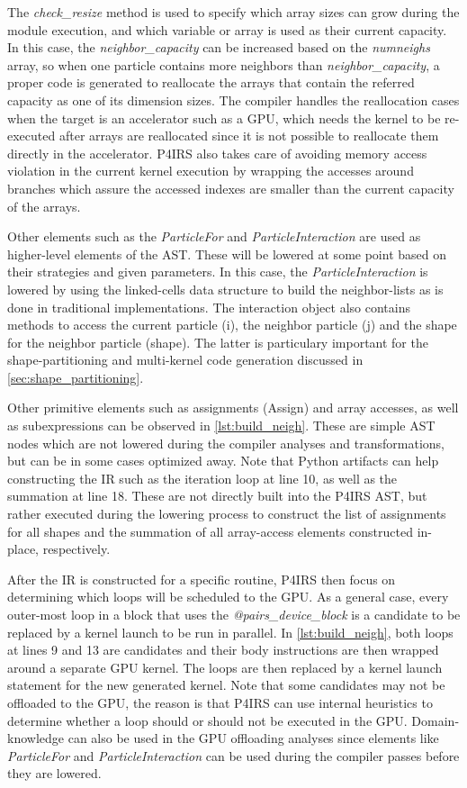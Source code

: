 \documentclass[preprint,12pt]{elsarticle}
\begin{document}
The \emph{check\_resize} method is used to specify which array sizes can grow during the module execution, and which variable or array is used as their current capacity.
In this case, the \emph{neighbor\_capacity} can be increased based on the \emph{numneighs} array, so when one particle contains more neighbors than \emph{neighbor\_capacity}, a proper code is generated to reallocate the arrays that contain the referred capacity as one of its dimension sizes.
The compiler handles the reallocation cases when the target is an accelerator such as a GPU, which needs the kernel to be re-executed after arrays are reallocated since it is not possible to reallocate them directly in the accelerator.
P4IRS also takes care of avoiding memory access violation in the current kernel execution by wrapping the accesses around branches which assure the accessed indexes are smaller than the current capacity of the arrays.

Other elements such as the \emph{ParticleFor} and \emph{ParticleInteraction} are used as higher-level elements of the AST.
These will be lowered at some point based on their strategies and given parameters.
In this case, the \emph{ParticleInteraction} is lowered by using the linked-cells data structure to build the neighbor-lists as is done in traditional implementations.
The interaction object also contains methods to access the current particle (i), the neighbor particle (j) and the shape for the neighbor particle (shape).
The latter is particulary important for the shape-partitioning and multi-kernel code generation discussed in \autoref{sec:shape_partitioning}.

Other primitive elements such as assignments (Assign) and array accesses, as well as subexpressions can be observed in \autoref{lst:build_neigh}.
These are simple AST nodes which are not lowered during the compiler analyses and transformations, but can be in some cases optimized away.
Note that Python artifacts can help constructing the IR such as the iteration loop at line 10, as well as the summation at line 18.
These are not directly built into the P4IRS AST, but rather executed during the lowering process to construct the list of assignments for all shapes and the summation of all array-access elements constructed in-place, respectively.

After the IR is constructed for a specific routine, P4IRS then focus on determining which loops will be scheduled to the GPU.
As a general case, every outer-most loop in a block that uses the \emph{@pairs\_device\_block} is a candidate to be replaced by a kernel launch to be run in parallel.
In \autoref{lst:build_neigh}, both loops at lines 9 and 13 are candidates and their body instructions are then wrapped around a separate GPU kernel.
The loops are then replaced by a kernel launch statement for the new generated kernel.
Note that some candidates may not be offloaded to the GPU, the reason is that P4IRS can use internal heuristics to determine whether a loop should or should not be executed in the GPU.
Domain-knowledge can also be used in the GPU offloading analyses since elements like \emph{ParticleFor} and \emph{ParticleInteraction} can be used during the compiler passes before they are lowered.
\end{document}
